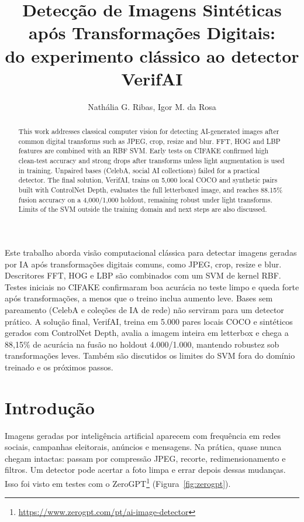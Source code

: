\documentclass[12pt]{article}
\title{Detecção de Imagens Sintéticas após Transformações Digitais:\\
do experimento clássico ao detector VerifAI}
\author{Nathália G. Ribas\inst{1}, Igor M. da Rosa\inst{1}}
\begin{document}
\maketitle

\begin{abstract}
This work addresses classical computer vision for detecting AI-generated images after common digital transforms such as JPEG, crop, resize and blur. FFT, HOG and LBP features are combined with an RBF SVM. Early tests on CIFAKE confirmed high clean-test accuracy and strong drops after transforms unless light augmentation is used in training. Unpaired bases (CelebA, social AI collections) failed for a practical detector. The final solution, VerifAI, trains on 5{,}000 local COCO and synthetic pairs built with ControlNet Depth, evaluates the full letterboxed image, and reaches 88.15\% fusion accuracy on a 4{,}000/1{,}000 holdout, remaining robust under light transforms. Limits of the SVM outside the training domain and next steps are also discussed.
\end{abstract}

\begin{resumo}
Este trabalho aborda visão computacional clássica para detectar imagens geradas por IA após transformações digitais comuns, como JPEG, crop, resize e blur. Descritores FFT, HOG e LBP são combinados com um SVM de kernel RBF. Testes iniciais no CIFAKE confirmaram boa acurácia no teste limpo e queda forte após transformações, a menos que o treino inclua aumento leve. Bases sem pareamento (CelebA e coleções de IA de rede) não serviram para um detector prático. A solução final, VerifAI, treina em 5{.}000 pares locais COCO e sintéticos gerados com ControlNet Depth, avalia a imagem inteira em letterbox e chega a 88,15\% de acurácia na fusão no holdout 4{.}000/1{.}000, mantendo robustez sob transformações leves. Também são discutidos os limites do SVM fora do domínio treinado e os próximos passos.
\end{resumo}

\section{Introdução}

Imagens geradas por inteligência artificial aparecem com frequência em redes sociais, campanhas eleitorais, anúncios e mensagens. Na prática, quase nunca chegam intactas: passam por compressão JPEG, recorte, redimensionamento e filtros. Um detector pode acertar a foto limpa e errar depois dessas mudanças. Isso foi visto em testes com o ZeroGPT\footnote{\url{https://www.zerogpt.com/pt/ai-image-detector}} (Figura~\ref{fig:zerogpt}).
\end{document}
